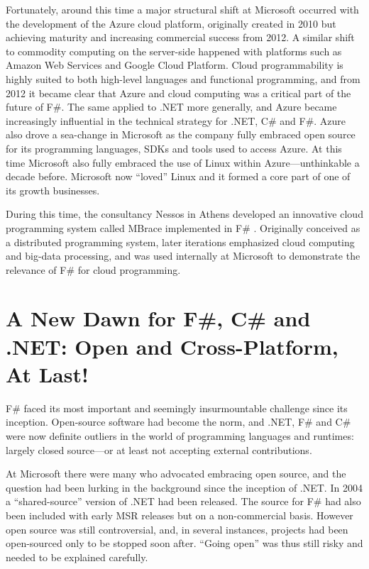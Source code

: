 \documentclass[acmsmall]{acmart}\settopmatter{}
\begin{document}
Fortunately, around this time a major structural shift at Microsoft occurred with the development of the Azure cloud platform,
originally created in 2010 but achieving maturity and increasing commercial success from 2012.  A similar shift to commodity
computing on the server-side happened with platforms such as Amazon Web Services and Google Cloud Platform.   Cloud
programmability is highly suited to both high-level languages and functional programming, and from 2012 it became clear that
Azure and cloud computing was a critical part of the future of F\#. The same applied to .NET more generally, and Azure
became increasingly influential in the technical strategy for .NET, C\# and F\#.  Azure also drove a sea-change in Microsoft
as the company fully embraced open source for its programming languages, SDKs and tools used to access Azure. At this
time Microsoft also fully embraced the use of Linux within Azure---unthinkable a decade before.  Microsoft now “loved” Linux
and it formed a core part of one of its growth businesses.

During this time, the consultancy Nessos in Athens developed an innovative cloud programming system called MBrace
implemented in F\# \citep{Dzik2013}. Originally conceived as a distributed
programming system, later iterations emphasized cloud computing and big-data processing, and was used internally at
Microsoft to demonstrate the relevance of F\# for cloud programming. 


\section*{A New Dawn for F\#, C\# and .NET: Open and Cross-Platform, At Last!}

F\# faced its most important and seemingly insurmountable challenge since its inception. Open-source software had
become the norm, and .NET, F\# and C\# were now definite outliers in the world of programming languages and
runtimes: largely closed source---or at least not accepting external contributions.  

At Microsoft there were many who advocated embracing open source, and the question had been lurking in the
background since the inception of .NET. In 2004 a “shared-source” version of .NET had been released. The source
for F\# had also been included with early MSR releases but on a non-commercial basis. However open source was
still controversial, and, in several instances, projects had been open-sourced only to be stopped soon
after.  “Going open” was thus still risky and needed to be explained carefully. 
\end{document}
